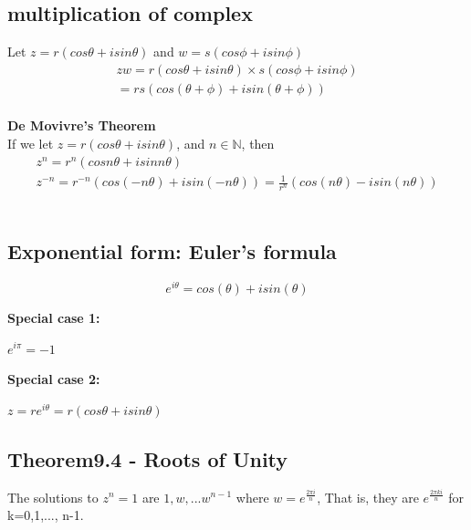 \documentclass{article}
\begin{document}
\subsection{multiplication of complex}
Let $z=r(cos \theta +isin \theta)$ and  $w=s(cos \phi + isin\phi)$\\
\begin{equation} 
\begin{aligned}
    zw = r(cos \theta + isin\theta)\times s(cos\phi + isin\phi)\\
    = rs(cos(\theta + \phi)+isin(\theta + \phi))
\end{aligned}
\end{equation}
\\
\textbf{De Movivre's Theorem}\\
If we let $z=r(cos\theta + isin\theta)$, and $n\in \mathbb{N}$, then\\
\begin{equation}
\begin{aligned}
    z^n = r^n(cos n\theta + isin n\theta)\\
    z^{-n} = r^{-n}(cos(-n\theta)+ isin(-n \theta)) = \frac{1}{r^{n}}(cos(n \theta)-isin(n\theta))
\end{aligned}
\end{equation}
\\

\subsection{Exponential form: Euler's formula}
\begin{center}
\begin{equation}
    e^{i \theta} = cos(\theta)+isin(\theta)
\end{equation}
\end{center}

\textbf{Special case 1:}\\
\begin{center}
    $e^{i \pi} = -1$
\end{center}

\textbf{Special case 2:}\\
\begin{center}
    $z=re^{i\theta}= r(cos\theta + isin\theta)$
\end{center}

\subsection{Theorem9.4 - Roots of Unity}
The solutions to $z^n = 1$ are $1,w,...w^{n-1}$ where $w=e^{\frac{2\pi i}{n}}$, 
That is, they are $e^{\frac{2\pi k i}{n}}$ for k=0,1,..., n-1.
\end{document}
